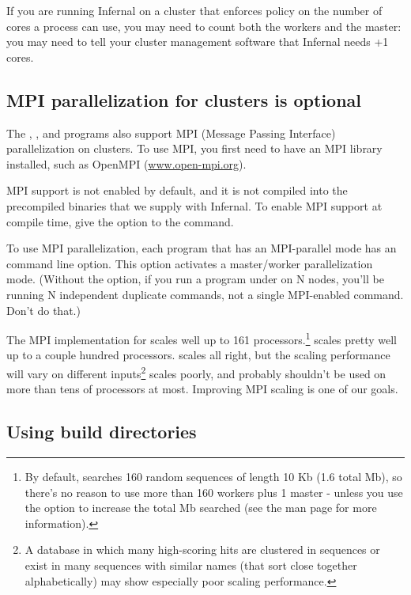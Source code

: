 If you are running Infernal on a cluster that enforces policy on the
number of cores a process can use, you may need to count both the
workers and the master: you may need to tell your cluster management
software that Infernal needs +1 cores.

\subsection{MPI parallelization for clusters is optional}

The , ,  and
 programs also support MPI (Message Passing Interface)
parallelization on clusters.  To use MPI, you first need to have an
MPI library installed, such as OpenMPI (\url{www.open-mpi.org}). 

MPI support is not enabled by default, and it is not compiled into the
precompiled binaries that we supply with Infernal. To enable MPI support
at compile time, give the  option to the
 command.

To use MPI parallelization, each program that has an MPI-parallel mode
has an  command line option. This option activates a
master/worker parallelization mode. (Without the  option,
if you run a program under  on N nodes, you'll be
running N independent duplicate commands, not a single MPI-enabled
command. Don't do that.)

The MPI implementation for  scales well up to 161
processors.\footnote{By default,  searches 160
random sequences of length 10 Kb (1.6 total Mb), so there's no reason
to use more than 160 workers plus 1 master - unless you use the
 option to increase the total Mb searched (see the
 man page for more information).} 
scales pretty well up to a couple hundred processors. 
scales all right, but the scaling performance will vary on different
inputs\footnote{A database in which many high-scoring hits are
  clustered in sequences or exist in many sequences with similar names
  (that sort close together alphabetically) may show especially poor
  scaling performance.}  scales poorly, and probably
shouldn't be used on more than tens of processors at most. Improving
MPI scaling is one of our goals.

\subsection{Using build directories}

